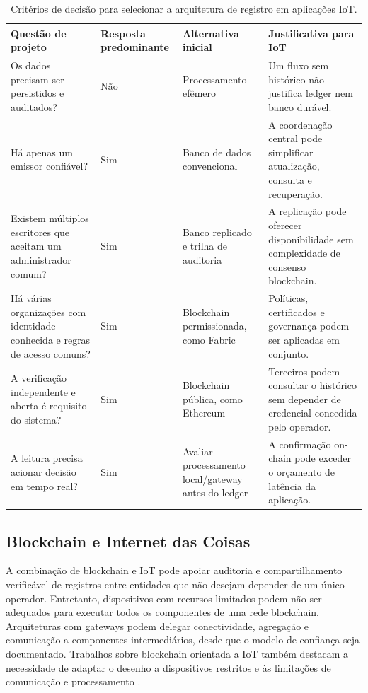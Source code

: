 \documentclass[10pt,a4paper,twocolumn]{article}
\begin{document}
\begin{table}[t]
\centering\small
\caption{Critérios de decisão para selecionar a arquitetura de registro em aplicações IoT.}
\label{tab:decisao}
\begin{tabularx}{\textwidth}{p{}p{}p{}X}
\toprule
Questão de projeto & Resposta predominante & Alternativa inicial & Justificativa para IoT \\
\midrule
Os dados precisam ser persistidos e auditados? & Não & Processamento efêmero & Um fluxo sem histórico não justifica ledger nem banco durável. \\
Há apenas um emissor confiável? & Sim & Banco de dados convencional & A coordenação central pode simplificar atualização, consulta e recuperação. \\
Existem múltiplos escritores que aceitam um administrador comum? & Sim & Banco replicado e trilha de auditoria & A replicação pode oferecer disponibilidade sem complexidade de consenso blockchain. \\
Há várias organizações com identidade conhecida e regras de acesso comuns? & Sim & Blockchain permissionada, como Fabric & Políticas, certificados e governança podem ser aplicadas em conjunto. \\
A verificação independente e aberta é requisito do sistema? & Sim & Blockchain pública, como Ethereum & Terceiros podem consultar o histórico sem depender de credencial concedida pelo operador. \\
A leitura precisa acionar decisão em tempo real? & Sim & Avaliar processamento local/gateway antes do ledger & A confirmação on-chain pode exceder o orçamento de latência da aplicação. \\
\bottomrule
\end{tabularx}
\end{table}

\subsection{Blockchain e Internet das Coisas}
A combinação de blockchain e IoT pode apoiar auditoria e compartilhamento verificável de registros entre entidades que não desejam depender de um único operador. Entretanto, dispositivos com recursos limitados podem não ser adequados para executar todos os componentes de uma rede blockchain. Arquiteturas com gateways podem delegar conectividade, agregação e comunicação a componentes intermediários, desde que o modelo de confiança seja documentado. Trabalhos sobre blockchain orientada a IoT também destacam a necessidade de adaptar o desenho a dispositivos restritos e às limitações de comunicação e processamento \cite{Christidis2016,Dorri2017,Dorri2017Optimized,RFC7228}.
\end{document}
